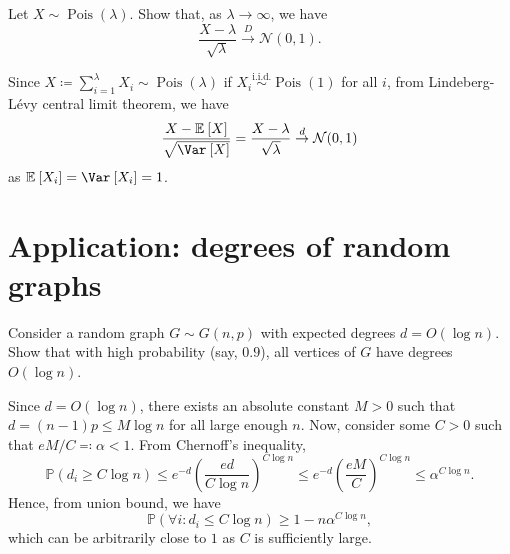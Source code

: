 \begin{problem*}[Exercise 2.3.8]\label{ex2.3.8}
	Let \(X \sim \operatorname{Pois}(\lambda ) \). Show that, as \(\lambda \to \infty \), we have
	\[
		\frac{X - \lambda }{\sqrt{\lambda } }
		\overset{D}{\to} \mathcal{N} (0, 1).
	\]
\end{problem*}
\begin{answer}
	Since \(X \coloneqq \sum_{i=1}^{\lambda } X_i \sim \operatorname{Pois}(\lambda ) \) if \(X_i \overset{\text{i.i.d.} }{\sim } \operatorname{Pois}(1) \) for all \(i\), from Lindeberg-Lévy central limit theorem, we have
	\[
		\frac{X - \mathbb{E}_{}\left[X \right] }{\sqrt{\Var_{}\left[X\right] } }
		= \frac{X - \lambda }{\sqrt{\lambda } }
		\overset{d}{\to } \mathcal{N} (0, 1)
	\]
	as \(\mathbb{E}_{}\left[X_i \right] = \Var_{}\left[X_i \right] = 1\).
\end{answer}

\section{Application: degrees of random graphs}
\begin{problem*}[Exercise 2.4.2]\label{ex2.4.2}
	Consider a random graph \(G \sim G(n, p)\) with expected degrees \(d = O(\log n)\). Show that with high probability (say, \(0.9\)), all vertices of \(G\) have degrees \(O(\log n)\).
\end{problem*}
\begin{answer}
	Since \(d = O(\log n)\), there exists an absolute constant \(M >0\) such that \(d = (n - 1) p \leq M \log n\) for all large enough \(n\). Now, consider some \(C > 0\) such that \(e M / C \eqqcolon \alpha < 1\). From Chernoff's inequality,
	\[
		\mathbb{P} (d_i \geq C \log n)
		\leq e^{-d} \left( \frac{e d}{C \log n} \right) ^{C \log n}
		\leq e^{-d} \left( \frac{e M}{C} \right) ^{C \log n}
		\leq \alpha ^{C \log n}.
	\]
	Hence, from union bound, we have
	\[
		\mathbb{P} (\forall i \colon d_i \leq C \log n)
		\geq 1 - n \alpha ^{C \log n},
	\]
	which can be arbitrarily close to \(1\) as \(C\) is sufficiently large.
\end{answer}

